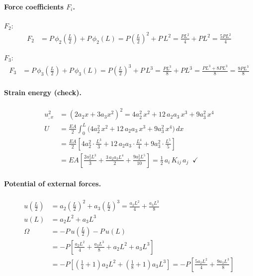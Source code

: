 \documentclass[11pt, a4paper]{article}
\begin{document}
\paragraph{Force coefficients $F_i$.}

\noindent$F_2$:
\begin{align*}
F_2 &= P\,\phi_2\!\left(\frac{L}{2}\right)+P\,\phi_2(L)
     = P\!\left(\frac{L}{2}\right)^{\!2}+P\,L^2
     = \frac{PL^2}{4}+PL^2
     = \frac{5PL^2}{4}
\end{align*}

\noindent$F_3$:
\begin{align*}
F_3 &= P\,\phi_3\!\left(\frac{L}{2}\right)+P\,\phi_3(L)
     = P\!\left(\frac{L}{2}\right)^{\!3}+P\,L^3
     = \frac{PL^3}{8}+PL^3
     = \frac{PL^3+8PL^3}{8}
     = \frac{9PL^3}{8}
\end{align*}

\paragraph{Strain energy (check).}
\begin{align*}
u_{,x}^2 &= (2a_2 x+3a_3 x^2)^2
           = 4a_2^2\,x^2+12\,a_2 a_3\,x^3+9a_3^2\,x^4 \\[6pt]
U &= \frac{EA}{2}\int_0^L\!\big(4a_2^2\,x^2+12\,a_2 a_3\,x^3+9a_3^2\,x^4\big)\,dx \\[4pt]
  &= \frac{EA}{2}\left[4a_2^2\cdot\frac{L^3}{3}+12\,a_2 a_3\cdot\frac{L^4}{4}+9a_3^2\cdot\frac{L^5}{5}\right] \\[4pt]
  &= EA\left[\frac{2a_2^2 L^3}{3}+\frac{3\,a_2 a_3 L^4}{2}+\frac{9a_3^2 L^5}{10}\right]
   = \frac{1}{2}\,a_i\,K_{ij}\,a_j \;\;\checkmark
\end{align*}

\paragraph{Potential of external forces.}
\begin{align*}
u\!\left(\frac{L}{2}\right) &= a_2\!\left(\frac{L}{2}\right)^{\!2}+a_3\!\left(\frac{L}{2}\right)^{\!3}
                              = \frac{a_2 L^2}{4}+\frac{a_3 L^3}{8} \\[6pt]
u(L) &= a_2 L^2+a_3 L^3 \\[6pt]
\Omega &= -P\,u\!\left(\frac{L}{2}\right)-P\,u(L) \\[2pt]
       &= -P\left[\frac{a_2 L^2}{4}+\frac{a_3 L^3}{8}+a_2 L^2+a_3 L^3\right] \\[2pt]
       &= -P\left[\left(\frac{1}{4}+1\right)a_2 L^2+\left(\frac{1}{8}+1\right)a_3 L^3\right]
        = -P\left[\frac{5a_2 L^2}{4}+\frac{9a_3 L^3}{8}\right]
\end{align*}
\end{document}
